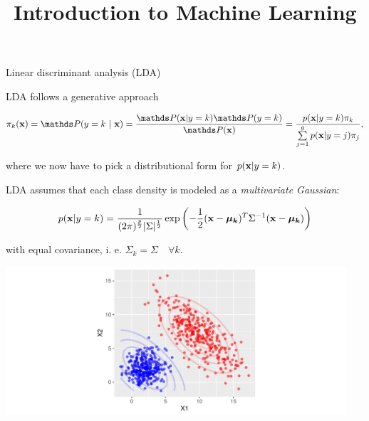 \documentclass[11pt,compress,t,notes=noshow, xcolor=table]{beamer}
\title{Introduction to Machine Learning}
\institute{\href{https://compstat-lmu.github.io/lecture_i2ml/}{compstat-lmu.github.io/lecture\_i2ml}}
\date{}
\begin{document}
\framebreak



\begin{vbframe}{Linear discriminant analysis (LDA)}


LDA follows a generative approach

$$\pikx = \postk = \frac{\P(\xv | y = k) \P(y = k)}{\P(\xv)} = \frac{\pdfxyk \pik}{\sumjg \pdfxyk[j] \pi_j},$$

where we now have to pick a distributional form for $p(\mathbf{x} | y= k)$.

\framebreak

LDA assumes that each class density is modeled as a \emph{multivariate Gaussian}:

$$
p(\mathbf{x} | y= k) = \frac{1}{(2\pi)^{\frac{p}{2}}|\Sigma|^{\frac{1}{2}}} \exp\left(-\frac{1}{2}(\mathbf{x} - \bm{\mu_k})^T \Sigma^{-1} (\mathbf{x} - \bm{\mu_k})\right)
$$

with equal covariance, i. e. $\Sigma_k = \Sigma \quad \forall k$. \\


\scriptsize
{}\color{fgcolor}

{\centering \includegraphics[width=0.95\textwidth]{figure/reg_class_dis_1}

}
\end{vbframe}
\end{document}
